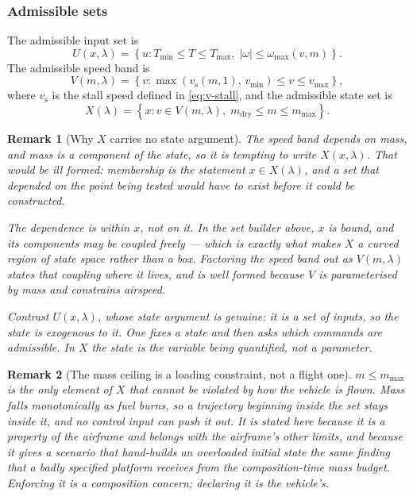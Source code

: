 \documentclass[11pt,a4paper]{article}
\newtheorem{remark}{Remark}
\newcommand{\Xset}{X}
\newcommand{\Uset}{U}
\newcommand{\Vset}{V}
\newcommand{\vecx}{x}
\newcommand{\vecu}{u}
\newcommand{\veclambda}{\lambda}
\begin{document}
\subsubsection{Admissible sets}

The admissible input set is
\begin{equation}
  \Uset(\vecx, \veclambda) = \left\{
    \vecu : T_{\min} \le T \le T_{\max},\;
    |\omega| \le \omega_{\max}(v, m)
  \right\}.
  \label{eq:U}
\end{equation}
The admissible speed band is
\begin{equation}
  \Vset(m, \veclambda) = \left\{
    v : \max\!\left(v_{\mathrm{s}}(m,1),\, v_{\min}\right) \le v \le v_{\max}
  \right\},
  \label{eq:V}
\end{equation}
where $v_{\mathrm{s}}$ is the stall speed defined in \cref{eq:v-stall}, and the
admissible state set is
\begin{equation}
  \Xset(\veclambda) = \left\{
    \vecx : v \in \Vset(m, \veclambda),\;
    m_{\mathrm{dry}} \le m \le m_{\max}
  \right\}.
  \label{eq:X}
\end{equation}

\begin{remark}[Why $\Xset$ carries no state argument]
\label{rem:X-not-state-dependent}
The speed band depends on mass, and mass is a component of the state, so it is
tempting to write $\Xset(\vecx, \veclambda)$. That would be ill formed:
membership is the statement $\vecx \in \Xset(\veclambda)$, and a set that
depended on the point being tested would have to exist before it could be
constructed.

The dependence is \emph{within} $\vecx$, not \emph{on} it. In the set builder
above, $\vecx$ is bound, and its components may be coupled freely --- which is
exactly what makes $\Xset$ a curved region of state space rather than a box.
Factoring the speed band out as $\Vset(m, \veclambda)$ states that coupling
where it lives, and is well formed because $\Vset$ is parameterised by mass and
constrains airspeed.

Contrast $\Uset(\vecx, \veclambda)$, whose state argument is genuine: it is a
set of \emph{inputs}, so the state is exogenous to it. One fixes a state and
then asks which commands are admissible. In $\Xset$ the state is the variable
being quantified, not a parameter.
\end{remark}

\begin{remark}[The mass ceiling is a loading constraint, not a flight one]
$m \le m_{\max}$ is the only element of $\Xset$ that cannot be violated by
how the vehicle is flown. Mass falls monotonically as fuel burns, so a
trajectory beginning inside the set stays inside it, and no control input can
push it out. It is stated here because it is a property of the airframe and
belongs with the airframe's other limits, and because it gives a scenario that
hand-builds an overloaded initial state the same finding that a badly
specified platform receives from the composition-time mass budget. Enforcing
it is a composition concern; declaring it is the vehicle's.
\end{remark}
\end{document}
